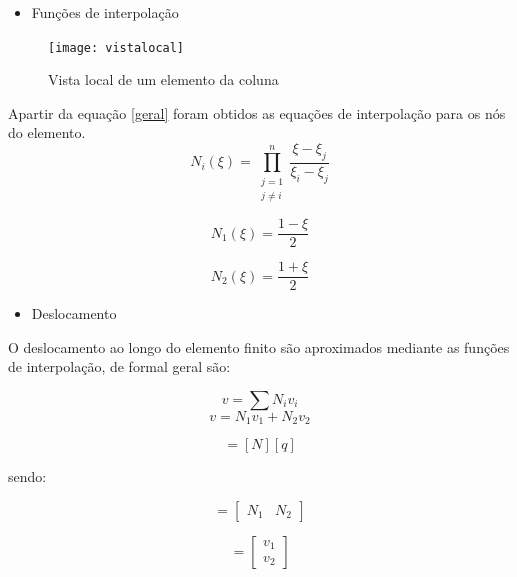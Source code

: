 \documentclass{article} %
\begin{document}
\begin{itemize}
	\item Funções de interpolação	
\end{itemize}

\begin{figure}[H]
	\centering
	\caption{Vista local de um elemento da coluna}
	\texttt{[image: vistalocal]}	
	\label{patton}	
\end{figure}

Apartir da equação \ref{geral} foram obtidos as equações de interpolação para os nós do elemento.
\begin{equation}\label{geral}
N_i(\xi)=\prod_{\begin{matrix}
	j=1\\ 
	j\neq i
	\end{matrix}}^n\frac{\xi-\xi_j}{\xi_i-\xi_j} 
\end{equation}

\begin{equation}
N_1(\xi)=\frac{1-\xi}{2}
\end{equation}




\begin{equation}
N_2(\xi)=\frac{1+\xi}{2}
\end{equation}

\begin{itemize}
	\item Deslocamento
\end{itemize}

\indent O deslocamento ao longo do elemento finito são aproximados mediante as funções de interpolação, de formal geral são:

\begin{equation}
v=\sum N_iv_i
\end{equation}
\begin{equation*}
v=N_1v_1+N_2v_2
\end{equation*}

\begin{equation*}
[v]=[N][q]
\end{equation*}

\indent sendo:

\begin{equation}
[N]=\begin{bmatrix}
N_1& N_2 
\end{bmatrix}
\end{equation}

\begin{equation}
[q]=\begin{bmatrix}
v_1\\ v_2 
\end{bmatrix}
\end{equation}
\end{document}
